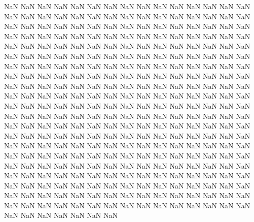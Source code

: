NaN
NaN
NaN
NaN
NaN
NaN
NaN
NaN
NaN
NaN
NaN
NaN
NaN
NaN
NaN
NaN
NaN
NaN
NaN
NaN
NaN
NaN
NaN
NaN
NaN
NaN
NaN
NaN
NaN
NaN
NaN
NaN
NaN
NaN
NaN
NaN
NaN
NaN
NaN
NaN
NaN
NaN
NaN
NaN
NaN
NaN
NaN
NaN
NaN
NaN
NaN
NaN
NaN
NaN
NaN
NaN
NaN
NaN
NaN
NaN
NaN
NaN
NaN
NaN
NaN
NaN
NaN
NaN
NaN
NaN
NaN
NaN
NaN
NaN
NaN
NaN
NaN
NaN
NaN
NaN
NaN
NaN
NaN
NaN
NaN
NaN
NaN
NaN
NaN
NaN
NaN
NaN
NaN
NaN
NaN
NaN
NaN
NaN
NaN
NaN
NaN
NaN
NaN
NaN
NaN
NaN
NaN
NaN
NaN
NaN
NaN
NaN
NaN
NaN
NaN
NaN
NaN
NaN
NaN
NaN
NaN
NaN
NaN
NaN
NaN
NaN
NaN
NaN
NaN
NaN
NaN
NaN
NaN
NaN
NaN
NaN
NaN
NaN
NaN
NaN
NaN
NaN
NaN
NaN
NaN
NaN
NaN
NaN
NaN
NaN
NaN
NaN
NaN
NaN
NaN
NaN
NaN
NaN
NaN
NaN
NaN
NaN
NaN
NaN
NaN
NaN
NaN
NaN
NaN
NaN
NaN
NaN
NaN
NaN
NaN
NaN
NaN
NaN
NaN
NaN
NaN
NaN
NaN
NaN
NaN
NaN
NaN
NaN
NaN
NaN
NaN
NaN
NaN
NaN
NaN
NaN
NaN
NaN
NaN
NaN
NaN
NaN
NaN
NaN
NaN
NaN
NaN
NaN
NaN
NaN
NaN
NaN
NaN
NaN
NaN
NaN
NaN
NaN
NaN
NaN
NaN
NaN
NaN
NaN
NaN
NaN
NaN
NaN
NaN
NaN
NaN
NaN
NaN
NaN
NaN
NaN
NaN
NaN
NaN
NaN
NaN
NaN
NaN
NaN
NaN
NaN
NaN
NaN
NaN
NaN
NaN
NaN
NaN
NaN
NaN
NaN
NaN
NaN
NaN
NaN
NaN
NaN
NaN
NaN
NaN
NaN
NaN
NaN
NaN
NaN
NaN
NaN
NaN
NaN
NaN
NaN
NaN
NaN
NaN
NaN
NaN
NaN
NaN
NaN
NaN
NaN
NaN
NaN
NaN
NaN
NaN
NaN
NaN
NaN
NaN
NaN
NaN
NaN
NaN
NaN
NaN
NaN
NaN
NaN
NaN
NaN
NaN
NaN
NaN
NaN
NaN
NaN
NaN
NaN
NaN
NaN
NaN
NaN
NaN
NaN
NaN
NaN
